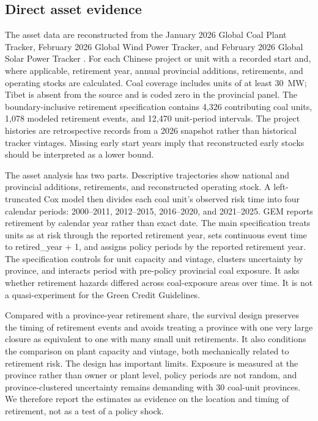 \documentclass[11pt]{article}
\begin{document}
\subsection{Direct asset evidence}

The asset data are reconstructed from the January 2026 Global Coal Plant Tracker, February 2026 Global Wind Power Tracker, and February 2026 Global Solar Power Tracker \parencite{gem2026}. For each Chinese project or unit with a recorded start and, where applicable, retirement year, annual provincial additions, retirements, and operating stocks are calculated. Coal coverage includes units of at least 30~MW; Tibet is absent from the source and is coded zero in the provincial panel. The boundary-inclusive retirement specification contains 4,326 contributing coal units, 1,078 modeled retirement events, and 12,470 unit-period intervals. The project histories are retrospective records from a 2026 snapshot rather than historical tracker vintages. Missing early start years imply that reconstructed early stocks should be interpreted as a lower bound.

The asset analysis has two parts. Descriptive trajectories show national and provincial additions, retirements, and reconstructed operating stock. A left-truncated Cox model then divides each coal unit's observed risk time into four calendar periods: 2000--2011, 2012--2015, 2016--2020, and 2021--2025. GEM reports retirement by calendar year rather than exact date. The main specification treats units as at risk through the reported retirement year, sets continuous event time to retired\_year + 1, and assigns policy periods by the reported retirement year. The specification controls for unit capacity and vintage, clusters uncertainty by province, and interacts period with pre-policy provincial coal exposure. It asks whether retirement hazards differed across coal-exposure areas over time. It is not a quasi-experiment for the Green Credit Guidelines.

Compared with a province-year retirement share, the survival design preserves the timing of retirement events and avoids treating a province with one very large closure as equivalent to one with many small unit retirements. It also conditions the comparison on plant capacity and vintage, both mechanically related to retirement risk. The design has important limits. Exposure is measured at the province rather than owner or plant level, policy periods are not random, and province-clustered uncertainty remains demanding with 30 coal-unit provinces. We therefore report the estimates as evidence on the location and timing of retirement, not as a test of a policy shock.
\end{document}
